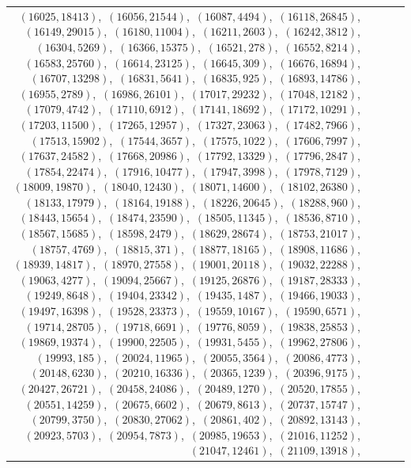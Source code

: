 \documentclass[11pt]{article}
\begin{document}
\begin{longtable}{@{}rrl>{\raggedright\arraybackslash}p{}@{}}
$(16025,18413)$,\allowbreak\ $(16056,21544)$,\allowbreak\ $(16087,4494)$,\allowbreak\ $(16118,26845)$,\allowbreak\ $(16149,29015)$,\allowbreak\ $(16180,11004)$,\allowbreak\ $(16211,2603)$,\allowbreak\ $(16242,3812)$,\allowbreak\ $(16304,5269)$,\allowbreak\ $(16366,15375)$,\allowbreak\ $(16521,278)$,\allowbreak\ $(16552,8214)$,\allowbreak\ $(16583,25760)$,\allowbreak\ $(16614,23125)$,\allowbreak\ $(16645,309)$,\allowbreak\ $(16676,16894)$,\allowbreak\ $(16707,13298)$,\allowbreak\ $(16831,5641)$,\allowbreak\ $(16835,925)$,\allowbreak\ $(16893,14786)$,\allowbreak\ $(16955,2789)$,\allowbreak\ $(16986,26101)$,\allowbreak\ $(17017,29232)$,\allowbreak\ $(17048,12182)$,\allowbreak\ $(17079,4742)$,\allowbreak\ $(17110,6912)$,\allowbreak\ $(17141,18692)$,\allowbreak\ $(17172,10291)$,\allowbreak\ $(17203,11500)$,\allowbreak\ $(17265,12957)$,\allowbreak\ $(17327,23063)$,\allowbreak\ $(17482,7966)$,\allowbreak\ $(17513,15902)$,\allowbreak\ $(17544,3657)$,\allowbreak\ $(17575,1022)$,\allowbreak\ $(17606,7997)$,\allowbreak\ $(17637,24582)$,\allowbreak\ $(17668,20986)$,\allowbreak\ $(17792,13329)$,\allowbreak\ $(17796,2847)$,\allowbreak\ $(17854,22474)$,\allowbreak\ $(17916,10477)$,\allowbreak\ $(17947,3998)$,\allowbreak\ $(17978,7129)$,\allowbreak\ $(18009,19870)$,\allowbreak\ $(18040,12430)$,\allowbreak\ $(18071,14600)$,\allowbreak\ $(18102,26380)$,\allowbreak\ $(18133,17979)$,\allowbreak\ $(18164,19188)$,\allowbreak\ $(18226,20645)$,\allowbreak\ $(18288,960)$,\allowbreak\ $(18443,15654)$,\allowbreak\ $(18474,23590)$,\allowbreak\ $(18505,11345)$,\allowbreak\ $(18536,8710)$,\allowbreak\ $(18567,15685)$,\allowbreak\ $(18598,2479)$,\allowbreak\ $(18629,28674)$,\allowbreak\ $(18753,21017)$,\allowbreak\ $(18757,4769)$,\allowbreak\ $(18815,371)$,\allowbreak\ $(18877,18165)$,\allowbreak\ $(18908,11686)$,\allowbreak\ $(18939,14817)$,\allowbreak\ $(18970,27558)$,\allowbreak\ $(19001,20118)$,\allowbreak\ $(19032,22288)$,\allowbreak\ $(19063,4277)$,\allowbreak\ $(19094,25667)$,\allowbreak\ $(19125,26876)$,\allowbreak\ $(19187,28333)$,\allowbreak\ $(19249,8648)$,\allowbreak\ $(19404,23342)$,\allowbreak\ $(19435,1487)$,\allowbreak\ $(19466,19033)$,\allowbreak\ $(19497,16398)$,\allowbreak\ $(19528,23373)$,\allowbreak\ $(19559,10167)$,\allowbreak\ $(19590,6571)$,\allowbreak\ $(19714,28705)$,\allowbreak\ $(19718,6691)$,\allowbreak\ $(19776,8059)$,\allowbreak\ $(19838,25853)$,\allowbreak\ $(19869,19374)$,\allowbreak\ $(19900,22505)$,\allowbreak\ $(19931,5455)$,\allowbreak\ $(19962,27806)$,\allowbreak\ $(19993,185)$,\allowbreak\ $(20024,11965)$,\allowbreak\ $(20055,3564)$,\allowbreak\ $(20086,4773)$,\allowbreak\ $(20148,6230)$,\allowbreak\ $(20210,16336)$,\allowbreak\ $(20365,1239)$,\allowbreak\ $(20396,9175)$,\allowbreak\ $(20427,26721)$,\allowbreak\ $(20458,24086)$,\allowbreak\ $(20489,1270)$,\allowbreak\ $(20520,17855)$,\allowbreak\ $(20551,14259)$,\allowbreak\ $(20675,6602)$,\allowbreak\ $(20679,8613)$,\allowbreak\ $(20737,15747)$,\allowbreak\ $(20799,3750)$,\allowbreak\ $(20830,27062)$,\allowbreak\ $(20861,402)$,\allowbreak\ $(20892,13143)$,\allowbreak\ $(20923,5703)$,\allowbreak\ $(20954,7873)$,\allowbreak\ $(20985,19653)$,\allowbreak\ $(21016,11252)$,\allowbreak\ $(21047,12461)$,\allowbreak\ $(21109,13918)$,\allowbreak\ 
\end{longtable}
\end{document}
